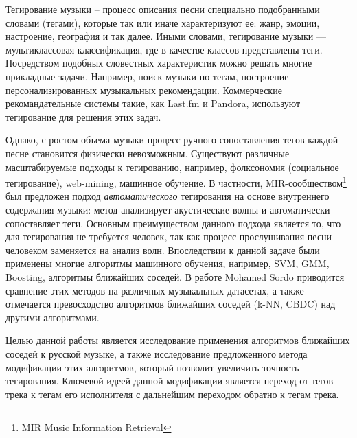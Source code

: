 \startprefacepage	

Тегирование музыки -- процесс описания песни специально подобранными словами (тегами), которые так или иначе характеризуют ее: жанр, эмоции, настроение, география и так далее.
Иными словами, тегирование музыки {{---}} мультиклассовая классификация, где в качестве классов представлены теги.
Посредством подобных словестных характеристик можно решать многие прикладные задачи. Например, поиск музыки по тегам, построение персонализированных музыкальных рекомендации.
Коммерческие рекомандательные системы такие, как Last.fm и Pandora, используют тегирование для решения этих задач. 

Однако, с ростом объема музыки процесс ручного сопоставления 
тегов каждой песне становится физически невозможным. Существуют различные масштабируемые подходы к тегированию, например, фолксономия (социальное тегирование), web-mining, машинное обучение. 
В частности, MIR-сообществом\footnote{MIR \ld Music Information Retrieval} был предложен подход \emph{автоматического} тегирования на основе внутреннего содержания музыки: метод анализирует акустические волны и автоматически сопоставляет теги. 
Основным преимуществом данного подхода является то, что для тегирования не требуется человек, так как процесс прослушивания песни человеком заменяется на анализ волн.
Впоследствии к данной задаче были применены многие алгоритмы машинного обучения, например, SVM, GMM, Boosting, алгоритмы ближайших соседей. 
В работе Mohamed Sordo приводится сравнение этих методов на различных музыкальных датасетах, а также отмечается превосходство алгоритмов ближайших соседей (k-NN, CBDC) над другими алгоритмами.

Целью данной работы является исследование применения алгоритмов ближайших соседей к русской музыке, а также исследование предложенного метода модификации этих алгоритмов, который
позволит увеличить точность тегирования.
Ключевой идеей данной модификации является переход от тегов трека к тегам его исполнителя с дальнейшим переходом обратно к тегам трека.
